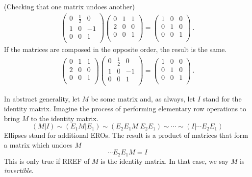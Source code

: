 \begin{example} (Checking that \hypertarget{inversie}{one matrix undoes another})
\begin{eqnarray*}
\left(\begin{array}{ccc}
0&\frac12&0\\
1 &0 &-1\\ 
0  &0 &1\\
\end{array}  \right)
\left(\begin{array}{ccc}
0&1&1\\
2 &0 &0\\ 
0  &0 &1\\
\end{array}  \right)
=
\left(\begin{array}{ccc}
1  &0 &0\\
0  &1 &0\\ 
0  &0 &1\\
\end{array}  \right) \, .
\end{eqnarray*}
If the matrices are composed in the opposite order, the result is the same.
\begin{eqnarray*}
\left(\begin{array}{ccc}
0&1&1\\
2 &0 &0\\ 
0  &0 &1\\
\end{array}  \right)
\left(\begin{array}{ccc}
0&\frac12&0\\
1 &0 &-1\\ 
0  &0 &1\\
\end{array}  \right)
=
\left(\begin{array}{ccc}
1  &0 &0\\
0  &1 &0\\ 
0  &0 &1\\
\end{array}  \right) \, .
\end{eqnarray*}
\end{example}



In abstract generality, let $M$ be some matrix and, as always, let $I$ stand for the identity matrix. Imagine the process of performing elementary row operations to bring $M$ to the identity matrix. 
\begin{equation*}
(M | I) \sim ( E_1M| E_1)\sim (E_2E_1 M | E_2 E_1) \sim \cdots \sim (I | \cdots E_2E_1 )
\end{equation*}
Ellipses stand for additional EROs. The result is a product of matrices that form a matrix which undoes $M$
\begin{equation*}
\cdots E_2 E_1 M =  I 
\end{equation*}
This is only true if RREF of $M$ is the identity matrix.  
In that case, we say $M$ is {\itshape invertible}. 



